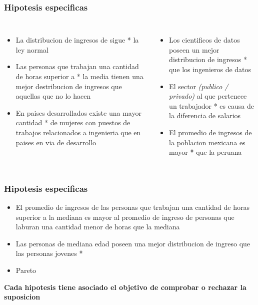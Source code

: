 \documentclass{beamer}
\begin{document}
\begin{frame}
\frametitle{Hipotesis especificas}

\begin{columns}

  \begin{itemize}
      \item La distribucion de ingresos de  sigue *
        la ley normal
      \item Las personas que trabajan una cantidad de horas superior a *
        la media tienen una mejor destribucion de ingresos que aquellas
        que no lo hacen
      \item En paises desarrollados existe una mayor cantidad *
        de mujeres con puestos de trabajos relacionados a ingenieria que en paises en via
        de desarrollo
  \end{itemize}


  \begin{itemize}
      \item Los cientificos de datos poseen un mejor distribucion de ingresos *
        que los ingenieros de datos
      \item El sector \textit{(publico / privado)} al que pertenece un trabajador *
        es causa de la diferencia de salarios
      \item El promedio de ingresos de la poblacion mexicana es mayor *
        que la peruana
  \end{itemize}
\end{columns}
\end{frame}


\begin{frame}
\frametitle{Hipotesis especificas}
  \begin{itemize}
      \item El \alert{promedio de ingresos} de las personas que trabajan
        una cantidad de horas superior a la mediana es mayor al promedio
        de ingreso de personas que laburan una cantidad menor de horas
        que la mediana
      \item Las personas de mediana edad poseen una mejor distribucion
        de ingreso que las personas jovenes *
      \item Pareto
  \end{itemize}

  \textbf{Cada hipotesis tiene asociado el objetivo de comprobar
  o rechazar la suposicion}

\end{frame}
\end{document}
